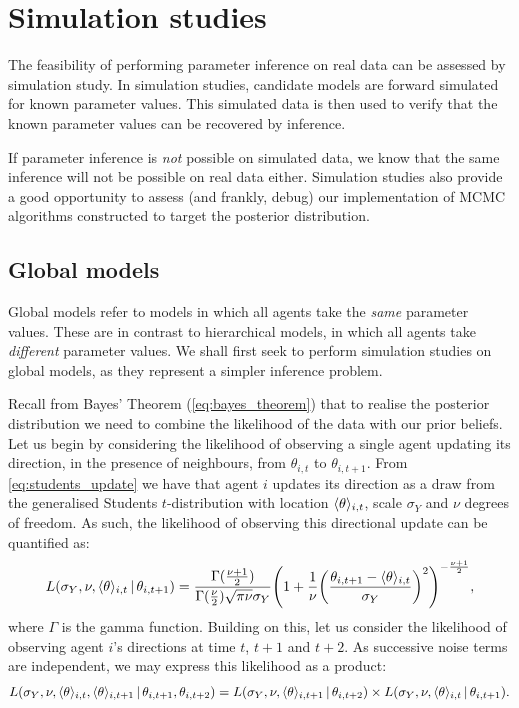 \graphicspath{{fig/sim_studies/}}

\chapter{Simulation studies}
\label{cha:sim_studies}

The feasibility of performing parameter inference on real data can be assessed by
simulation study. In simulation studies, candidate models are forward simulated for known
parameter values. This simulated data is then used to verify that the known parameter
values can be recovered by inference.

If parameter inference is \emph{not} possible on simulated data, we know that the same
inference will not be possible on real data either. Simulation studies also provide a good
opportunity to assess (and frankly, debug) our implementation of MCMC algorithms
constructed to target the posterior distribution.

\section{Global models}

Global models refer to models in which all agents take the \emph{same} parameter values.
These are in contrast to hierarchical models, in which all agents take \emph{different}
parameter values.  We shall first seek to perform simulation studies on global
models, as they represent a simpler inference problem.  

Recall from Bayes' Theorem (\cref{eq:bayes_theorem}) that to realise the posterior
distribution we need to combine the likelihood of the data with our prior beliefs. Let us
begin by considering the likelihood of observing a single agent updating its direction, in
the presence of neighbours, from $\theta_{i, t}$ to $\theta_{i, t+1}$.
From \cref{eq:students_update} we have that agent $i$ updates its direction as a draw from
the generalised Students $t$-distribution with location $\langle\theta\rangle_{i,t}$, scale
$\sigma_Y$ and $\nu$ degrees of freedom. As such, the likelihood of observing this
directional update can be quantified as:
\begin{equation*}
    L(\sigma_Y, \nu, \langle\theta\rangle_{i,t} \,|\, \theta_{i,t+1}) = 
    \frac{\Gamma(\frac{\nu +1 }{2})}{\Gamma(\frac{\nu}{2})\sqrt{\pi\nu}\sigma_Y}
        \Bigg(1 + \frac{1}{\nu}
                  \bigg(\frac{\theta_{i,t+1}-\langle\theta\rangle_{i,t}}{\sigma_Y}\bigg)^2
        \Bigg)^{-\frac{\nu+1}{2}},
\end{equation*}
where $\Gamma$ is the gamma function. Building on this, let us consider the likelihood of
observing agent $i$'s directions at time $t$, $t+1$ and $t+2$. As successive noise terms
are independent, we may express this likelihood as a product:
\begin{align*}
    L(\sigma_Y,\nu,\langle\theta\rangle_{i,t},\langle\theta\rangle_{i,t+1}\,|\,\theta_{i,t+1},
    \theta_{i,t+2})
    = L(\sigma_Y,\nu,\langle\theta\rangle_{i,t+1}\,|\,\theta_{i,t+2})\times
    L(\sigma_Y,\nu,\langle\theta\rangle_{i,t}\,|\,\theta_{i,t+1}).
\end{align*}

